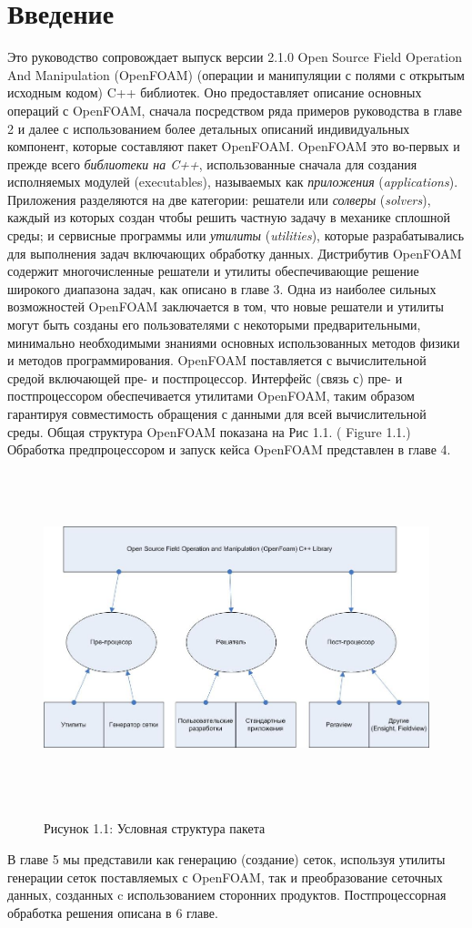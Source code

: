 \chapter{Введение}
Это руководство сопровождает выпуск версии 2.1.0 Open Source Field Operation And Manipulation (OpenFOAM) 
(операции и манипуляции с полями с открытым исходным кодом) C++ библиотек. Оно предоставляет описание основных операций
 с OpenFOAM, сначала посредством ряда примеров руководства в главе 2 и далее с использованием более детальных описаний 
индивидуальных компонент, которые составляют пакет OpenFOAM.
OpenFOAM это во-первых и прежде всего \textit{библиотеки на C++}, использованные сначала для создания исполняемых модулей 
(executables), называемых как \textit{приложения} (\textit{applications}). Приложения разделяются на две категории:
 решатели или \textit{солверы} (\textit{solvers}), каждый из которых создан чтобы решить частную задачу в механике сплошной
 среды; и сервисные программы или \textit{утилиты} (\textit{utilities}), которые разрабатывались для выполнения задач
 включающих обработку данных.  Дистрибутив OpenFOAM содержит многочисленные решатели и утилиты обеспечивающие
 решение широкого диапазона задач, как описано в главе 3.
Одна из наиболее сильных возможностей OpenFOAM заключается в том, что новые решатели и утилиты могут быть созданы его
 пользователями с некоторыми предварительными, минимально необходимыми знаниями основных использованных методов физики
 и методов программирования.
OpenFOAM поставляется с вычислительной средой включающей  пре- и постпроцессор. Интерфейс (связь с) пре- и постпроцессором
 обеспечивается утилитами OpenFOAM, таким образом гарантируя совместимость обращения с данными для всей вычислительной среды.
 Общая структура OpenFOAM показана на Рис 1.1. ( Figure 1.1.) Обработка предпроцессором и запуск кейса
OpenFOAM представлен в главе 4.
\begin{figure}[h]
 \centering
 \includegraphics[width=531pt,height=273pt]{UGFigure1-1.PNG}
 \label{fig:1.1}
 \caption{Рисунок 1.1: Условная структура пакета}
\end{figure}

 В главе 5 мы представили как  генерацию (создание) сеток, используя  утилиты генерации сеток
 поставляемых с OpenFOAM, так и преобразование сеточных данных, созданных c использованием сторонних продуктов.
 Постпроцессорная обработка решения описана в 6 главе.